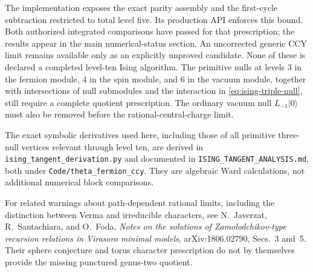 The implementation exposes the exact parity assembly and the
first-cycle subtraction restricted to total level five.  Its production
API enforces this bound.  Both authorized integrated comparisons have
passed for that prescription; the results appear in the main
numerical-status section.  An uncorrected generic CCY limit remains
available only as an explicitly unproved candidate.  None of these is
declared a completed level-ten Ising algorithm.
The primitive nulls at levels $3$ in the fermion module, $4$ in the
spin module, and $6$ in the vacuum module, together with intersections
of null submodules and the interaction in
\eqref{eq:ising-triple-null}, still require a complete quotient
prescription.  The ordinary vacuum null $L_{-1}|0\rangle$ must also
be removed before the rational-central-charge limit.

The exact symbolic derivatives used here, including those of all
primitive three-null vertices relevant through level ten, are derived
in \texttt{ising\_tangent\_derivation.py} and documented in
\texttt{ISING\_TANGENT\_ANALYSIS.md}, both under
\texttt{Code/theta\_fermion\_ccy}.  They are
algebraic Ward calculations, not additional numerical block comparisons.

For related warnings about path-dependent rational limits, including
the distinction between Verma and irreducible characters, see
N.~Javerzat, R.~Santachiara, and O.~Foda,
\emph{Notes on the solutions of Zamolodchikov-type recursion relations
in Virasoro minimal models}, arXiv:1806.02790, Secs.~3 and~5.
Their sphere conjecture and torus character prescription do not by
themselves provide the missing punctured genus-two quotient.
